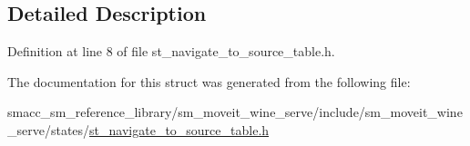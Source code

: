 \subsection{Detailed Description}


Definition at line 8 of file st\+\_\+navigate\+\_\+to\+\_\+source\+\_\+table.\+h.



The documentation for this struct was generated from the following file\+:\begin{DoxyCompactItemize}
\item 
smacc\+\_\+sm\+\_\+reference\+\_\+library/sm\+\_\+moveit\+\_\+wine\+\_\+serve/include/sm\+\_\+moveit\+\_\+wine\+\_\+serve/states/\hyperlink{sm__moveit__wine__serve_2include_2sm__moveit__wine__serve_2states_2st__navigate__to__source__table_8h}{st\+\_\+navigate\+\_\+to\+\_\+source\+\_\+table.\+h}\end{DoxyCompactItemize}
